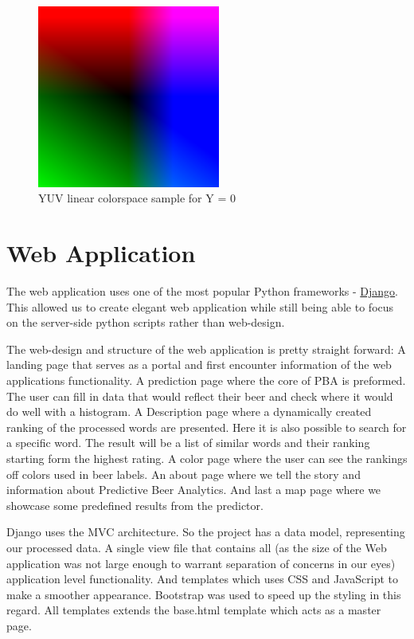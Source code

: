 \documentclass[10pt]{IEEEtran}
\begin{document}
\begin{figure}[t]
  \centering
  \includegraphics[width=6cm]{./graphics/YUV.png}
  \caption{YUV linear colorspace sample for Y = 0}
  \label{fig:colorspace}
\end{figure}

\section{Web Application}

The web application uses one of the most popular Python frameworks - \href{https://www.djangoproject.com/}{Django}. This allowed us to create elegant web application while still being able to focus on the server-side python scripts rather than web-design.

The web-design and structure of the web application is pretty straight forward:
A landing page that serves as a portal and first encounter information of the web applications functionality.
A prediction page where the core of PBA is preformed.
The user can fill in data that would reflect their beer and check where it would do well with a histogram.
A Description page where a dynamically created ranking of the processed words are presented.
Here it is also possible to search for a specific word.
The result will be a list of similar words and their ranking starting form the highest rating.
A color page where the user can see the rankings off colors used in beer labels.
An about page where we tell the story and information about Predictive Beer Analytics.
And last a map page where we showcase some predefined results from the predictor.

Django uses the MVC architecture. So the project has a data model, representing our processed data.
A single view file that contains all (as the size of the Web application was not large enough to warrant separation of concerns in our eyes) application level functionality. And templates which uses CSS and JavaScript to make a smoother appearance.
Bootstrap was used to speed up the styling in this regard. All templates extends the base.html template which
acts as a master page.
\end{document}
